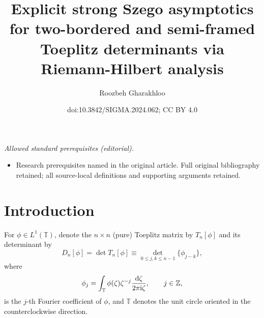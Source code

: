 \documentclass[10pt,a4paper]{amsart}
\title{Explicit strong Szego asymptotics for two-bordered and semi-framed Toeplitz determinants via Riemann-Hilbert analysis}
\author{Roozbeh Gharakhloo}
\date{doi:10.3842/SIGMA.2024.062; CC BY 4.0}
\numberwithin{equation}{section}
\newcommand{\Z}{{\mathbb Z}}
\newcommand{\T}{{\mathbb T}}
\newcommand{\ze}{\zeta}
\newcommand{\ii}{{\rm i}}
\newcommand{\dd}{{\rm d}}
\begin{document}
\maketitle
\noindent\textit{Allowed standard prerequisites (editorial).}\begin{itemize}
\item Research prerequisites named in the original article. Full original bibliography retained; all source-local definitions and supporting arguments retained.
\end{itemize}\medskip
\section{Introduction}
For $\phi \in L^1(\T)$, denote the $n \times n$ (pure) Toeplitz matrix by $T_n[\phi]$ and its determinant by
\begin{equation}\label{ToeplitzDet}
	D_n[\phi] = \det T_n[\phi] \equiv \underset{0 \leq j,k\leq n-1}{\det} \{ \phi_{j-k} \},
\end{equation}
where \begin{equation*}
	\phi_j = \int_{\T} \phi(\ze)\ze^{-j} \frac{\dd \ze}{2 \pi \ii \ze}, \qquad j \in \Z,
\end{equation*}
is the $j$-th Fourier coefficient of $\phi$, and $\T$ denotes the unit circle oriented in the counterclockwise direction.
\end{document}
